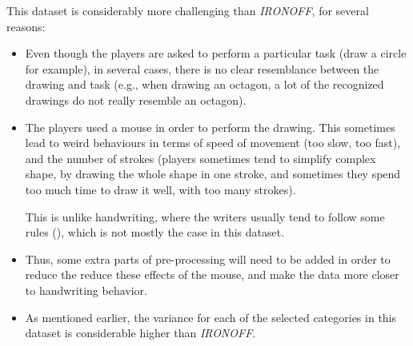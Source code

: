 \par This dataset is considerably more challenging than \textit{IRONOFF}, for several reasons:
\begin{itemize}[noitemsep]
    \item Even though the players are asked to perform a particular task (draw a circle for example), in several cases, there is no clear resemblance between the drawing and task (e.g., when drawing an octagon, a lot of the recognized drawings do not really resemble an octagon).
    \item The players used a mouse in order to perform the drawing. This sometimes lead to weird behaviours in terms of speed of movement (too slow, too fast), and the number of strokes (players sometimes tend to simplify complex shape, by drawing the whole shape in one stroke, and sometimes they spend too much time to draw it well, with too many strokes).

    This is unlike handwriting, where the writers usually tend to follow some rules (\citep{seraphin2019analyzing}), which is not mostly the case in this dataset.

    \item Thus, some extra parts of pre-processing will need to be added in order to reduce the reduce these effects of the mouse, and make the data more closer to handwriting behavior.

    \item As mentioned earlier, the variance for each of the selected categories in this dataset is considerable higher than \textit{IRONOFF}.
\end{itemize}



